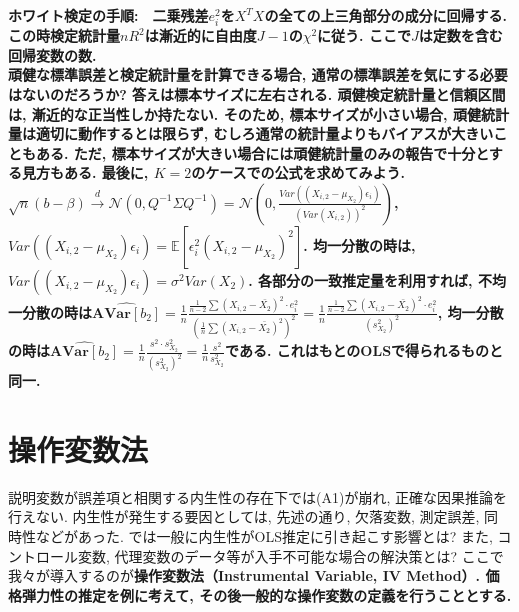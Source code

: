 \documentclass[paper=a4paper,fontsize=10pt]{jlreq}
\begin{document}
\rmfamily\mcfamily\bfseries{ホワイト検定の手順}\mdseries :　二乗残差$e_i^2$を$X^T X$の全ての上三角部分の成分に回帰する. この時検定統計量$nR^2$は漸近的に自由度$J-1$の$\chi^2$に従う. ここで$J$は定数を含む回帰変数の数.\\

頑健な標準誤差と検定統計量を計算できる場合, 通常の標準誤差を気にする必要はないのだろうか? 答えは標本サイズに左右される. 頑健検定統計量と信頼区間は, 漸近的な正当性しか持たない. そのため, 標本サイズが小さい場合, 頑健統計量は適切に動作するとは限らず, むしろ通常の統計量よりもバイアスが大きいこともある. ただ, 標本サイズが大きい場合には頑健統計量のみの報告で十分とする見方もある. 最後に, $K=2$のケースでの公式を求めてみよう. $\sqrt{n}({b}-\beta) \overset{d}{\to} \mathcal{N}({0}, Q^{-1}\Sigma Q^{-1}) = \mathcal{N}({0}, \frac{Var((X_{i,2}-\mu_{X_2})\epsilon_i)}{(Var(X_{i,2}))^2})$, $Var((X_{i,2}-\mu_{X_2})\epsilon_i)=\mathbb{E}[\epsilon_i^2(X_{i,2}-\mu_{X_2})^2]$. 均一分散の時は, $Var((X_{i,2}-\mu_{X_2})\epsilon_i)=\sigma^2 Var(X_2)$. 各部分の一致推定量を利用すれば, 不均一分散の時は$\hat{\mathbf{\text{AVar}}[b_2]}=\frac{1}{n}\frac{\frac{1}{n-2}\sum(X_{i,2}-\bar{X_2})^2\cdot e_i^2}{(\frac{1}{n}\sum(X_{i,2}-\bar{X_2})^2)^2} = \frac{1}{n}\frac{\frac{1}{n-2}\sum(X_{i,2}-\bar{X_2})^2\cdot e_i^2}{(s_{X_2}^2)^2}$, 均一分散の時は$\hat{\mathbf{\text{AVar}}[b_2]} = \frac{1}{n}\frac{s^2\cdot s_{X_2}^2}{(s_{X_2}^2)^2} = \frac{1}{n}\frac{s^2}{s_{X_2}^2}$である. これはもとのOLSで得られるものと同一.\\

\section{操作変数法}
説明変数が誤差項と相関する内生性の存在下では(A1)が崩れ, 正確な因果推論を行えない. 内生性が発生する要因としては, 先述の通り, 欠落変数, 測定誤差, 同時性などがあった. では一般に内生性がOLS推定に引き起こす影響とは? また, コントロール変数, 代理変数のデータ等が入手不可能な場合の解決策とは? ここで我々が導入するのが\rmfamily\mcfamily\bfseries{操作変数法（Instrumental Variable, IV Method）}\mdseries . 価格弾力性の推定を例に考えて, その後一般的な操作変数の定義を行うこととする.\\
\end{document}
